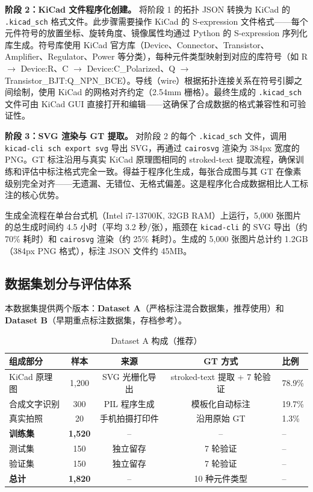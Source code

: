 \textbf{阶段 2：KiCad 文件程序化创建。} 将阶段 1 的拓扑 JSON 转换为 KiCad 的 \texttt{.kicad\_sch} 格式文件。此步骤需要操作 KiCad 的 S-expression 文件格式——每个元件符号的放置坐标、旋转角度、镜像属性均通过 Python 的 S-expression 序列化库生成。符号库使用 KiCad 官方库（Device、Connector、Transistor、Amplifier、Regulator、Power 等分类），每种元件类型映射到对应的库符号（如 R $\to$ Device:R、C $\to$ Device:C\_Polarized、Q $\to$ Transistor\_BJT:Q\_NPN\_BCE）。导线（wire）根据拓扑连接关系在符号引脚之间绘制，使用 KiCad 的网格对齐约定（2.54mm 栅格）。最终生成的 \texttt{.kicad\_sch} 文件可由 KiCad GUI 直接打开和编辑——这确保了合成数据的格式兼容性和可验证性。

\textbf{阶段 3：SVG 渲染与 GT 提取。} 对阶段 2 的每个 \texttt{.kicad\_sch} 文件，调用 \texttt{kicad-cli sch export svg} 导出 SVG，再通过 \texttt{cairosvg} 渲染为 384px 宽度的 PNG。GT 标注沿用与真实 KiCad 原理图相同的 stroked-text 提取流程，确保训练和评估中标注格式完全一致。得益于程序化生成，每张合成图与其 GT 在像素级别完全对齐——无遗漏、无错位、无格式偏差。这是程序化合成数据相比人工标注的核心优势。

生成全流程在单台台式机（Intel i7-13700K, 32GB RAM）上运行，5,000 张图片的总生成时间约 4.5 小时（平均 3.2 秒/张），瓶颈在 \texttt{kicad-cli} 的 SVG 导出（约 70\% 耗时）和 \texttt{cairosvg} 渲染（约 25\% 耗时）。生成的 5,000 张图片总计约 1.2GB（384px PNG 格式），标注 JSON 文件约 45MB。

\subsection{数据集划分与评估体系}

本数据集提供两个版本：\textbf{Dataset A}（严格标注混合数据集，推荐使用）和 \textbf{Dataset B}（早期重点标注数据集，存档参考）。

\begin{table}[h]
\centering
\caption{Dataset A 构成（推荐）}
\label{tab:dataset}
\begin{tabular}{lcccl}
\toprule
\textbf{组成部分} & \textbf{样本} & \textbf{来源} & \textbf{GT 方式} & \textbf{比例} \\
\midrule
KiCad 原理图   & 1,200 & SVG 光栅化导出 & stroked-text 提取 + 7 轮验证 & 78.9\% \\
合成文字识别   & 300   & PIL 程序生成   & 模板化自动标注 & 19.7\% \\
真实拍照       & 20    & 手机拍摄打印件 & 沿用原始 GT & 1.3\% \\
\midrule
\textbf{训练集} & \textbf{1,520} & -- & -- & -- \\
测试集         & 150   & 独立留存 & 7 轮验证 & -- \\
验证集         & 150   & 独立留存 & 7 轮验证 & -- \\
\midrule
\textbf{总计}   & \textbf{1,820} & -- & 10 种元件类型 & -- \\
\bottomrule
\end{tabular}
\end{table}


